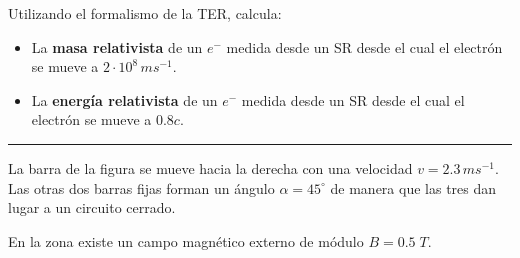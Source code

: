\documentclass[a4paper,12pt]{exam}
\newcommand{\halmos}{\vspace*{-7mm}
	
					\begin{flushright}
						\rule{1mm}{2.5mm} 
					\end{flushright}\vspace*{-10mm}
						
					  }
\renewcommand{\qed}{\halmos}
\begin{document}
\begin{enumerate}
 			
%	    
	\item Utilizando el formalismo de la {\small TER}, calcula:
	\begin{itemize}
			\item[a)] La \textbf{masa relativista} de un $e^-$ medida desde un {\small SR}  desde el cual el electrón se mueve a $2\cdot 10^8\,ms^{-1}$.
			\item[b)] La \textbf{energía relativista} de un $e^-$ medida desde un {\small SR}  desde el cual el electrón se mueve a $0.8c$.
		\end{itemize}
	\qed
	\vspace{1ex}
	
\begin{minipage}{13cm}
		\item  La barra de la figura se mueve hacia la derecha con una velocidad $v = 2.3\,ms^{-1}$. Las otras dos barras fijas forman un ángulo $\alpha= 45^\circ$ de manera que las tres dan lugar a un circuito cerrado.

En la zona existe un campo magnético externo de módulo $B=0.5\; T$. 
			
			
\end{minipage}\hfill
\begin{minipage}{4.5cm}
	\vspace{1.5ex}
	

\end{minipage}
\end{enumerate}
\end{document}
